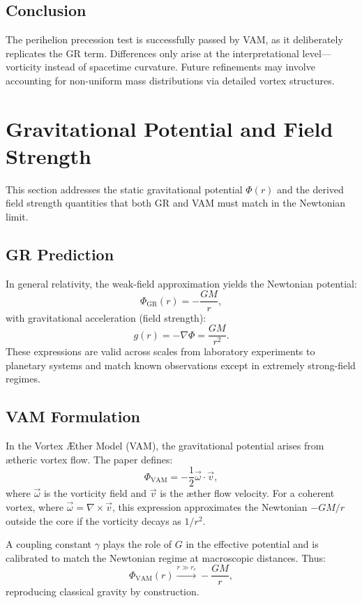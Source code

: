 \documentclass[a4paper, aps,preprint,superscriptaddress, 12pt]{revtex4}
\begin{document}
\subsection*{Conclusion}
The perihelion precession test is successfully passed by VAM, as it deliberately replicates the GR term. Differences only arise at the interpretational level—vorticity instead of spacetime curvature. Future refinements may involve accounting for non-uniform mass distributions via detailed vortex structures.
\section{Gravitational Potential and Field Strength}

This section addresses the static gravitational potential $\Phi(r)$ and the derived field strength quantities that both GR and VAM must match in the Newtonian limit.

\subsection{GR Prediction}
In general relativity, the weak-field approximation yields the Newtonian potential:
\begin{equation}
    \Phi_\text{GR}(r) = -\frac{GM}{r},
\end{equation}
with gravitational acceleration (field strength):
\begin{equation}
    g(r) = -\nabla \Phi = \frac{GM}{r^2}.
\end{equation}
These expressions are valid across scales from laboratory experiments to planetary systems and match known observations except in extremely strong-field regimes.

\subsection{VAM Formulation}
In the Vortex Æther Model (VAM), the gravitational potential arises from ætheric vortex flow. The paper defines:
\begin{equation}
    \Phi_\text{VAM} = -\frac{1}{2} \vec{\omega} \cdot \vec{v},
\end{equation}
where $\vec{\omega}$ is the vorticity field and $\vec{v}$ is the æther flow velocity. For a coherent vortex, where $\vec{\omega} = \nabla \times \vec{v}$, this expression approximates the Newtonian $-GM/r$ outside the core if the vorticity decays as $1/r^2$.

A coupling constant $\gamma$ plays the role of $G$ in the effective potential and is calibrated to match the Newtonian regime at macroscopic distances. Thus:
\begin{equation}
    \Phi_\text{VAM}(r) \xrightarrow{r \gg r_c} -\frac{GM}{r},
\end{equation}
reproducing classical gravity by construction.
\end{document}
